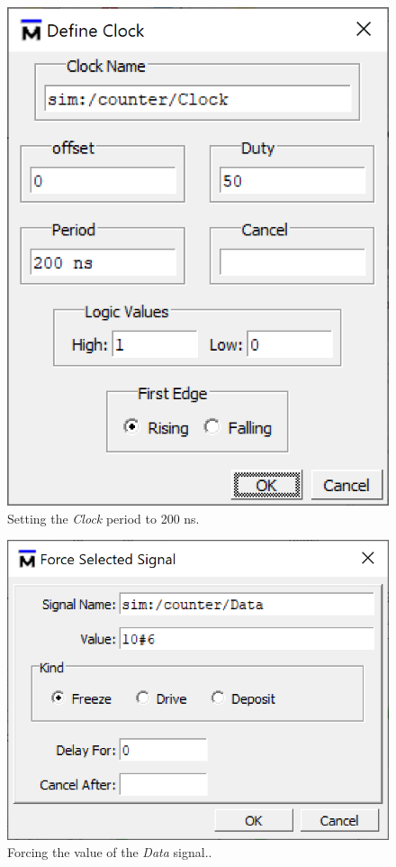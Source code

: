 \documentclass[11pt, twoside, pdftex]{article}
\begin{document}
\begin{figure}[H]
   \begin{center}
      \includegraphics[scale=.75]{figures/counter_clock_200.png}
       \caption{Setting the {\it Clock} period to 200 ns.} 
	 \label{fig:counter_clock_200}
	 \end{center}
\end{figure}

\begin{figure}[H]
   \begin{center}
      \includegraphics[scale=.75]{figures/counter_force_6.png}
       \caption{Forcing the value of the {\it Data} signal..} 
	 \label{fig:counter_force_6}
	 \end{center}
\end{figure}
\end{document}
